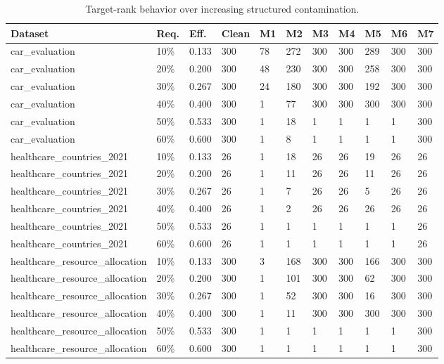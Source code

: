 \begin{table}[htbp]
\centering
\small
\caption{Target-rank behavior over increasing structured contamination.}
\label{tab:attack_fraction_target_rank}
\begin{tabular}{lllllllllll}
\hline
Dataset & Req. & Eff. & Clean & M1 & M2 & M3 & M4 & M5 & M6 & M7 \\
\hline
car\_evaluation & 10\% & 0.133 & 300 & 78 & 272 & 300 & 300 & 289 & 300 & 300 \\
car\_evaluation & 20\% & 0.200 & 300 & 48 & 230 & 300 & 300 & 258 & 300 & 300 \\
car\_evaluation & 30\% & 0.267 & 300 & 24 & 180 & 300 & 300 & 192 & 300 & 300 \\
car\_evaluation & 40\% & 0.400 & 300 & 1 & 77 & 300 & 300 & 300 & 300 & 300 \\
car\_evaluation & 50\% & 0.533 & 300 & 1 & 18 & 1 & 1 & 1 & 1 & 300 \\
car\_evaluation & 60\% & 0.600 & 300 & 1 & 8 & 1 & 1 & 1 & 1 & 300 \\
healthcare\_countries\_2021 & 10\% & 0.133 & 26 & 1 & 18 & 26 & 26 & 19 & 26 & 26 \\
healthcare\_countries\_2021 & 20\% & 0.200 & 26 & 1 & 11 & 26 & 26 & 11 & 26 & 26 \\
healthcare\_countries\_2021 & 30\% & 0.267 & 26 & 1 & 7 & 26 & 26 & 5 & 26 & 26 \\
healthcare\_countries\_2021 & 40\% & 0.400 & 26 & 1 & 2 & 26 & 26 & 26 & 26 & 26 \\
healthcare\_countries\_2021 & 50\% & 0.533 & 26 & 1 & 1 & 1 & 1 & 1 & 1 & 26 \\
healthcare\_countries\_2021 & 60\% & 0.600 & 26 & 1 & 1 & 1 & 1 & 1 & 1 & 26 \\
healthcare\_resource\_allocation & 10\% & 0.133 & 300 & 3 & 168 & 300 & 300 & 166 & 300 & 300 \\
healthcare\_resource\_allocation & 20\% & 0.200 & 300 & 1 & 101 & 300 & 300 & 62 & 300 & 300 \\
healthcare\_resource\_allocation & 30\% & 0.267 & 300 & 1 & 52 & 300 & 300 & 16 & 300 & 300 \\
healthcare\_resource\_allocation & 40\% & 0.400 & 300 & 1 & 11 & 300 & 300 & 300 & 300 & 300 \\
healthcare\_resource\_allocation & 50\% & 0.533 & 300 & 1 & 1 & 1 & 1 & 1 & 1 & 300 \\
healthcare\_resource\_allocation & 60\% & 0.600 & 300 & 1 & 1 & 1 & 1 & 1 & 1 & 300 \\
\hline
\end{tabular}
\end{table}
